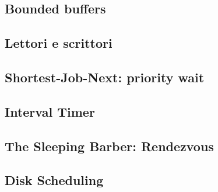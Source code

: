 \documentclass[10pt,a4paper]{book}
\begin{document}
\subsection{Bounded buffers}

\subsection{Lettori e scrittori}

\subsection{Shortest-Job-Next: priority wait}

\subsection{Interval Timer}

\subsection{The Sleeping Barber: Rendezvous}


\subsection{Disk Scheduling}
\end{document}
